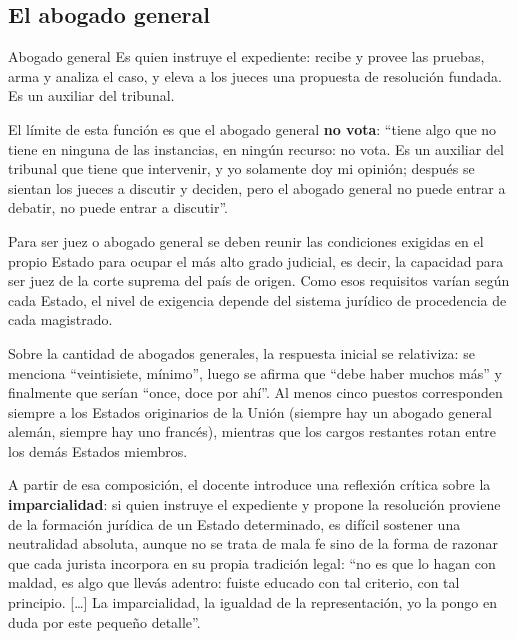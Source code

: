 \documentclass[12pt,oneside]{book}
\begin{document}
\subsection{El abogado general}

\begin{definition}{Abogado general}
Es quien instruye el expediente: recibe y provee las pruebas, arma y analiza el caso, y eleva a los jueces una propuesta de resolución fundada. Es un auxiliar del tribunal.
\end{definition}

El límite de esta función es que el abogado general \textbf{no vota}: “tiene algo que no tiene en ninguna de las instancias, en ningún recurso: no vota. Es un auxiliar del tribunal que tiene que intervenir, y yo solamente doy mi opinión; después se sientan los jueces a discutir y deciden, pero el abogado general no puede entrar a debatir, no puede entrar a discutir”.

Para ser juez o abogado general se deben reunir las condiciones exigidas en el propio Estado para ocupar el más alto grado judicial, es decir, la capacidad para ser juez de la corte suprema del país de origen. Como esos requisitos varían según cada Estado, el nivel de exigencia depende del sistema jurídico de procedencia de cada magistrado.

Sobre la cantidad de abogados generales, la respuesta inicial se relativiza: se menciona “veintisiete, mínimo”, luego se afirma que “debe haber muchos más” y finalmente que serían “once, doce por ahí”. Al menos cinco puestos corresponden siempre a los Estados originarios de la Unión (siempre hay un abogado general alemán, siempre hay uno francés), mientras que los cargos restantes rotan entre los demás Estados miembros.

A partir de esa composición, el docente introduce una reflexión crítica sobre la \textbf{imparcialidad}: si quien instruye el expediente y propone la resolución proviene de la formación jurídica de un Estado determinado, es difícil sostener una neutralidad absoluta, aunque no se trata de mala fe sino de la forma de razonar que cada jurista incorpora en su propia tradición legal: “no es que lo hagan con maldad, es algo que llevás adentro: fuiste educado con tal criterio, con tal principio. […] La imparcialidad, la igualdad de la representación, yo la pongo en duda por este pequeño detalle”.
\end{document}
